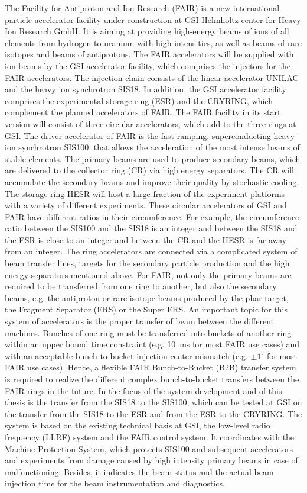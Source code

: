 The Facility for Antiproton and Ion Research (FAIR) is a new international particle accelerator facility under construction at GSI Helmholtz center for Heavy Ion Research GmbH. It is aiming at providing high-energy beams of ions of all elements from hydrogen to uranium with high intensities, as well as beams of rare isotopes and beams of antiprotons. The FAIR accelerators will be supplied with ion beams by the GSI accelerator facility, which comprises the injectors for the FAIR accelerators. The injection chain consists of the linear accelerator UNILAC and the heavy ion synchrotron SIS18. In addition, the GSI accelerator facility comprises the experimental storage ring (ESR) and the CRYRING, which complement the planned accelerators of FAIR. The FAIR facility in its start version will consist of three circular accelerators, which add to the three rings at GSI. The driver accelerator of FAIR is the fast ramping, superconducting heavy ion synchrotron SIS100, that allows the acceleration of the most intense beams of stable elements. The primary beams are used to produce secondary beams, which are delivered to the collector ring (CR) via high energy separators. The CR will accumulate the secondary beams and improve their quality by stochastic cooling. The storage ring HESR will host a large fraction of the experiment platforms with a variety of different experiments. These circular accelerators of GSI and FAIR have different ratios in their circumference. For example, the circumference ratio between the SIS100 and the SIS18 is an integer and between the SIS18 and the ESR is close to an integer and between the CR and the HESR is far away from an integer. The ring accelerators are connected via a complicated system of beam transfer lines, targets for the secondary particle production and the high energy separators mentioned above. For FAIR, not only the primary beams are required to be transferred from one ring to another, but also the secondary beams, e.g. the antiproton or rare isotope beams produced by the pbar target, the Fragment Separator (FRS) or the Super FRS. An important topic for this system of accelerators is the proper transfer of beam between the different machines. Bunches of one ring must be transferred into buckets of another ring within an upper bound time constraint (e.g. \SI{10}{\ms} for most FAIR use cases) and with an acceptable bunch-to-bucket injection center mismatch (e.g. $\pm1^\circ$ for most FAIR use cases). Hence, a flexible FAIR Bunch-to-Bucket (B2B) transfer system is required to realize the different complex bunch-to-bucket transfers between the FAIR rings in the future. In the focus of the system development and of this thesis is the transfer from the SIS18 to the SIS100, which can be tested at GSI on the transfer from the SIS18 to the ESR and from the ESR to the CRYRING. The system is based on the existing technical basis at GSI, the low-level radio frequency (LLRF) system and the FAIR control system. It coordinates with the Machine Protection System, which protects SIS100 and subsequent accelerators and experiments from damage caused by high intensity primary beams in case of malfunctioning. Besides, it indicates the beam status and the actual beam injection time for the beam instrumentation and diagnostics. 

